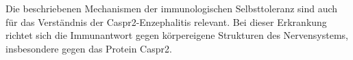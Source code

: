 
Die beschriebenen Mechanismen der immunologischen Selbsttoleranz sind auch für das Verständnis der Caspr2-Enzephalitis relevant. Bei dieser Erkrankung richtet sich die Immunantwort gegen körpereigene Strukturen des Nervensystems, insbesondere gegen das Protein Caspr2. 

